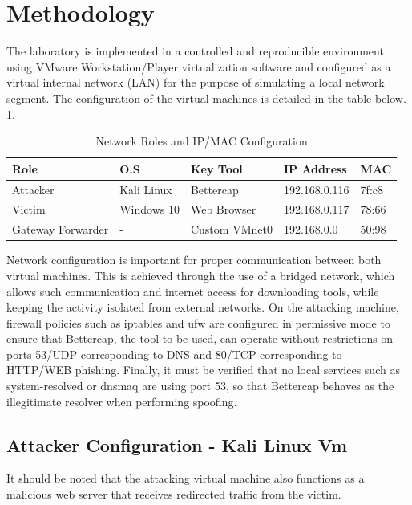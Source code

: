 \documentclass[conference]{IEEEtran}
\begin{document}
\section{Methodology}
The laboratory is implemented in a controlled and reproducible environment using VMware Workstation/Player virtualization software and configured as a virtual internal network (LAN) for the purpose of simulating a local network segment. The configuration of the virtual machines is detailed in the table below. \ref{tab:rolesip}.


\begin{table}[htbp]
\caption{Network Roles and IP/MAC Configuration}
\label{tab:rolesip}
\begin{center}
\begin{tabular}{@{}p{1.5cm} p{1.5cm} p{1.5cm} p{1.5cm} p{1cm}@{}} \hline
\textbf{Role} & \textbf{O.S} & \textbf{Key Tool} & \textbf{IP Address} & \textbf{MAC} \\ \hline
Attacker & Kali Linux & Bettercap & 192.168.0.116 & 7f:c8 \\
Victim & Windows 10 & Web Browser & 192.168.0.117 & 78:66 \\
Gateway Forwarder & - & Custom VMnet0 & 192.168.0.0 & 50:98 \\
\hline
\end{tabular}
\end{center}
\end{table}

Network configuration is important for proper communication between both virtual machines. This is achieved through the use of a bridged network, which allows such communication and internet access for downloading tools, while keeping the activity isolated from external networks. On the attacking machine, firewall policies such as iptables and ufw are configured in permissive mode to ensure that Bettercap, the tool to be used, can operate without restrictions on ports 53/UDP corresponding to DNS and 80/TCP corresponding to HTTP/WEB phishing. Finally, it must be verified that no local services such as system-resolved or dnsmaq are using port 53, so that Bettercap behaves as the illegitimate resolver when performing spoofing.

\subsection{Attacker Configuration - Kali Linux Vm}
It should be noted that the attacking virtual machine also functions as a malicious web server that receives redirected traffic from the victim.
\end{document}
